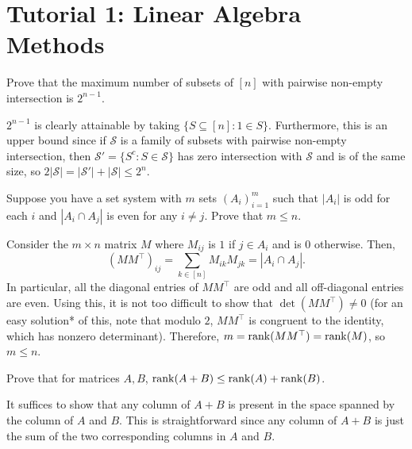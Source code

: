 \documentclass{article}
\begin{document}
\thispagestyle{empty}
\titleBC

\tableofcontents

\vspace{1cm}

\clearpage

\section{Tutorial 1: Linear Algebra Methods}

	\begin{exercise}
		Prove that the maximum number of subsets of $[n]$ with pairwise non-empty intersection is $2^{n-1}$.
	\end{exercise}
	\begin{solution*}
		$2^{n-1}$ is clearly attainable by taking $\{S \subseteq [n] : 1 \in S\}$. Furthermore, this is an upper bound since if $\mathcal{S}$ is a family of subsets with pairwise non-empty intersection, then $\mathcal{S}' = \{S^c : S \in \mathcal{S}\}$ has zero intersection with $\mathcal{S}$ and is of the same size, so $2|\mathcal{S}| = |\mathcal{S}'|+|\mathcal{S}| \le 2^n$.
	\end{solution*}

	\begin{exercise}
		\label{ex1.2}
		Suppose you have a set system with $m$ sets $(A_i)_{i=1}^m$ such that $|A_i|$ is odd for each $i$ and $|A_i \cap A_j|$ is even for any $i \ne j$. Prove that $m \le n$.
	\end{exercise}
	\begin{solution*}
		Consider the $m \times n$ matrix $M$ where $M_{ij}$ is $1$ if $j \in A_i$ and is $0$ otherwise. Then,
		\[ (MM^\top)_{ij} = \sum_{k \in [n]} M_{ik} M_{jk} = |A_i \cap A_j|. \]
		In particular, all the diagonal entries of $MM^\top$ are odd and all off-diagonal entries are even. Using this, it is not too difficult to show that $\det(MM^\top) \ne 0$ (for an easy solution* of this, note that modulo $2$, $MM^\top$ is congruent to the identity, which has nonzero determinant). Therefore, $m = \operatorname{rank}(MM^\top) = \operatorname{rank}(M)$, so $m \le n$.
	\end{solution*}

	\begin{exercise}
		\label{ex1.3}
		Prove that for matrices $A,B$, $\operatorname{rank}(A+B) \le \operatorname{rank}(A)+\operatorname{rank}(B)$.
	\end{exercise}
	\begin{solution*}
		It suffices to show that any column of $A+B$ is present in the space spanned by the column of $A$ and $B$. This is straightforward since any column of $A+B$ is just the sum of the two corresponding columns in $A$ and $B$.
	\end{solution*}
\end{document}

